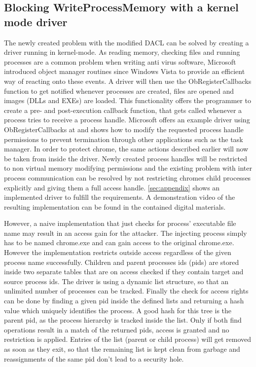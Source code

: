 \subsection{Blocking WriteProcessMemory with a kernel mode driver}
The newly created problem with the modified DACL can be solved by creating a driver running in kernel-mode. As reading memory, checking files and running processes are a common problem when writing anti virus software, Microsoft introduced object manager routines since Windows Vista to provide an efficient way of reacting onto these events. A driver will then use the ObRegisterCallbacks function to get notified whenever processes are created, files are opened and images (DLLs and EXEs) are loaded. This functionality offers the programmer to create a pre- and post-execution callback function, that gets called whenever a process tries to receive a process handle. Microsoft offers an example driver using ObRegisterCallbacks at \cite{github_obcallback} and shows how to modify the requested process handle permissions to prevent termination through other applications such as the task manager. In order to protect chrome, the same actions described earlier will now be taken from inside the driver. Newly created process handles will be restricted to non virtual memory modifying permissions and the existing problem with inter process communication can be resolved by not restricting chromes child processes explicitly and giving them a full access handle. \ref{sec:appendix} shows an implemented driver to fulfill the requirements. A demonstration video of the resulting implementation can be found in the contained digital materials.

However, a naive implementation that just checks for process' executable file name may result in an access gain for the attacker. The injecting process simply has to be named chrome.exe and can gain access to the original chrome.exe. However the implementation restricts outside access regardless of the given process name successfully. Children and parent processes ids (pids) are stored inside two separate tables that are on access checked if they contain target and source process ids. The driver is using a dynamic list structure, so that an unlimited number of processes can be tracked. Finally the check for access rights can be done by finding a given pid inside the defined lists and returning a hash value which uniquely identifies the process. A good hash for this tree is the parent pid, as the process hierarchy is tracked inside the list. Only if both find operations result in a match of the returned pids, access is granted and no restriction is applied. Entries of the list (parent or child process) will get removed as soon as they exit, so that the remaining list is kept clean from garbage and reassignments of the same pid don't lead to a security hole. 

